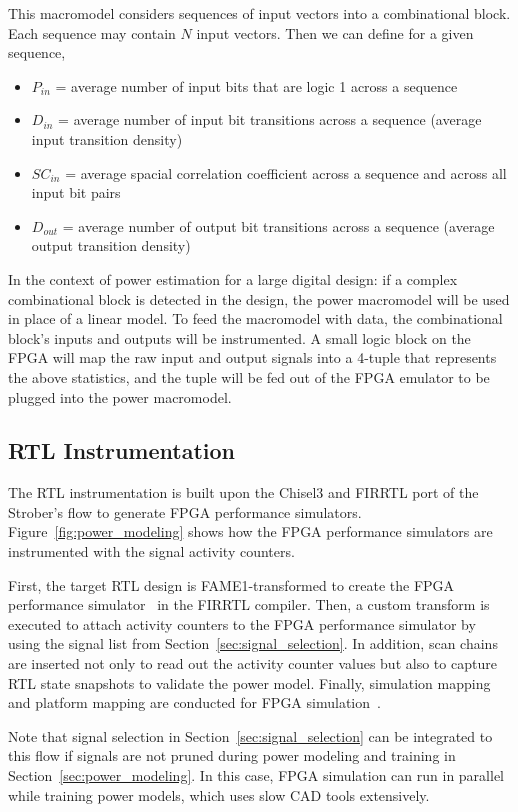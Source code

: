 This macromodel considers sequences of input vectors into a combinational block. Each sequence may contain $N$ input vectors. Then we can define for a given sequence,
\begin{itemize}
	\item $P_{in}$ = average number of input bits that are logic 1 across a sequence
	\item $D_{in}$ = average number of input bit transitions across a sequence (average input transition density)
	\item $SC_{in}$ = average spacial correlation coefficient across a sequence and across all input bit pairs
	\item $D_{out}$ = average number of output bit transitions across a sequence (average output transition density)
\end{itemize}

In the context of power estimation for a large digital design: if a complex combinational block is detected in the design, the power macromodel will be used in place of a linear model. To feed the macromodel with data, the combinational block's inputs and outputs will be instrumented. A small logic block on the FPGA will map the raw input and output signals into a 4-tuple that represents the above statistics, and the tuple will be fed out of the FPGA emulator to be plugged into the power macromodel.

\subsection{RTL Instrumentation}
\label{sec:instrumentation}
The RTL instrumentation is built upon the Chisel3 and FIRRTL port of the Strober's flow
to generate FPGA performance simulators. Figure~\ref{fig:power_modeling} shows how
the FPGA performance simulators are instrumented with the signal activity counters.

First, the target RTL design is FAME1-transformed to create the FPGA performance simulator~\cite{Kim2016}
in the FIRRTL compiler. Then, a custom transform is executed to attach activity counters
to the FPGA performance simulator by using the signal list from Section~\ref{sec:signal_selection}.
In addition, scan chains are inserted not only to read out the activity counter values but also to
capture RTL state snapshots to validate the power model. Finally, simulation mapping and platform mapping
are conducted for FPGA simulation~\cite{Kim2016}.

Note that signal selection in Section~\ref{sec:signal_selection} can be integrated to
this flow if signals are not pruned during power modeling and training in
Section~\ref{sec:power_modeling}. In this case, FPGA simulation can run in parallel while
training power models, which uses slow CAD tools extensively.

